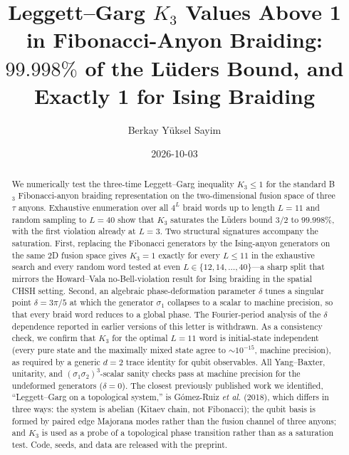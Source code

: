 \documentclass[aps,prx,reprint,amsmath,amssymb,floatfix,nofootinbib,superscriptaddress]{revtex4-2}
\begin{document}
\setcounter{secnumdepth}{3} %

\title{Leggett--Garg $K_{3}$ Values Above 1 in Fibonacci-Anyon Braiding:\\
$99.998\%$ of the L\"uders Bound, and Exactly 1 for Ising Braiding}

\author{Berkay Y\"uksel Sayim}

\date{2026-10-03}

\begin{abstract}
We numerically test the three-time Leggett--Garg inequality
$K_{3} \leq 1$ for the standard B$_{3}$ Fibonacci-anyon braiding
representation on the two-dimensional fusion space of three $\tau$ anyons.
Exhaustive enumeration over all $4^{L}$ braid words up to length $L=11$
and random sampling to $L=40$ show that $K_{3}$ saturates the L\"uders
bound $3/2$ to $99.998\%$, with the first violation already at $L=3$.
Two structural signatures accompany the saturation. First, replacing
the Fibonacci generators by the Ising-anyon generators on the same
$2$D fusion space gives $K_{3}=1$ exactly for every $L\leq11$ in the
exhaustive search and every random word tested at even
$L\in\{12,14,\ldots,40\}$---a sharp split that mirrors the Howard--Vala
no-Bell-violation result for Ising braiding in the spatial CHSH setting.
Second, an algebraic phase-deformation parameter $\delta$ tunes
a singular point
$\delta = 3\pi/5$ at which the generator $\sigma_{1}$ collapses to a
scalar to machine precision, so that every braid word reduces to a
global phase. The Fourier-period analysis of the $\delta$ dependence
reported in earlier versions of this letter is withdrawn. As a
consistency check, we confirm that
$K_{3}$ for the optimal $L=11$ word is initial-state independent
(every pure state and the maximally mixed state agree to
$\sim 10^{-15}$, machine precision),
as required by a generic $d=2$ trace identity for qubit observables.
All Yang--Baxter, unitarity, and $(\sigma_{1}\sigma_{2})^{3}$-scalar
sanity checks pass at machine precision for the undeformed generators
($\delta = 0$). The closest previously published work we identified,
``Leggett--Garg on a topological system,'' is
G\'omez-Ruiz \emph{et al.} (2018), which differs in three ways: the
system is abelian (Kitaev chain, not Fibonacci); the qubit basis is
formed by paired edge Majorana modes rather than the fusion channel
of three anyons; and $K_{3}$ is used as a probe of a topological
phase transition rather than as a saturation test. Code,
seeds, and data are released with the preprint.
\end{abstract}
\end{document}
